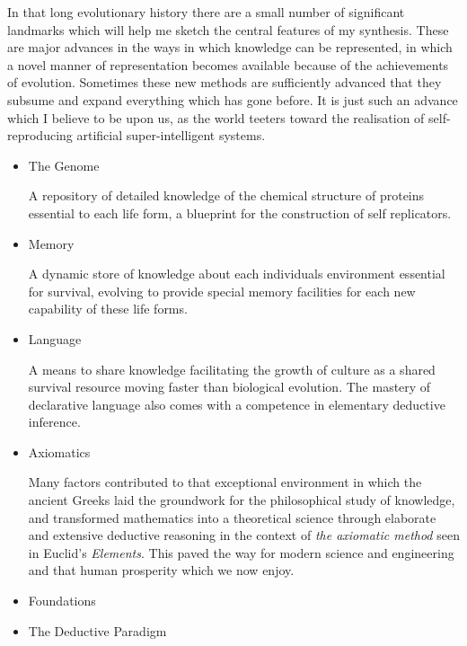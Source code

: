 \documentclass[10pt,titlepage]{book}
\begin{document}
In that long evolutionary history there are a small number of significant landmarks which will help me sketch the central features of my synthesis.
These are major advances in the ways in which knowledge can be represented, in which a novel manner of representation becomes available  because of the achievements of evolution.
Sometimes these new methods are sufficiently advanced that they subsume and expand everything which has gone before.
It is just such an advance which I believe to be upon us, as the world teeters toward the realisation of self-reproducing artificial super-intelligent systems.

\begin{itemize}
\item{The Genome}
  
  A repository of detailed knowledge of the chemical structure of proteins essential to each life form, a blueprint for the construction of self replicators.
  
\item{Memory}
  
  A dynamic store of knowledge about each individuals environment essential for survival, evolving to provide special memory facilities for each new capability of these life forms.
  
\item{Language}
  
  A means to share knowledge facilitating the growth of culture as a shared survival resource moving faster than biological evolution.
 The mastery of declarative language also comes with a competence in elementary deductive inference.
  
\item{Axiomatics}

  Many factors contributed to that exceptional environment in which the ancient Greeks laid the groundwork for the philosophical study of knowledge, and transformed mathematics into a theoretical science through elaborate and extensive deductive reasoning in the context of \emph{the axiomatic method} seen in Euclid's \emph{Elements}\cite{EuclidEL1}.
  This paved the way for modern science and engineering and that human prosperity which we now enjoy.
  
\item{Foundations}


  
\item{The Deductive Paradigm}
  
\end{itemize}
\end{document}
